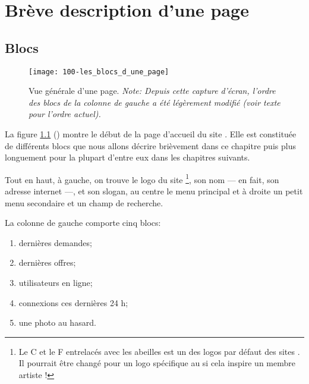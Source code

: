 \chapter{Brève description d'une page}

\section{Blocs}

\begin{figure}
    \texttt{[image: 100-les\_blocs\_d\_une\_page]}
    \caption[Vue générale d’une page]{Vue générale d’une page. \textsl{\small Note: Depuis cette capture d'écran, l'ordre des blocs de la colonne de gauche a été légèrement modifié (voir texte pour l'ordre actuel).}}
    \label{fig:vueGeneralePage}
\end{figure}

La figure \ref{fig:vueGeneralePage} () montre le début de la page d'accueil du site \CF. Elle est constituée de différents blocs que nous allons décrire brièvement dans ce chapitre puis plus longuement pour la plupart d’entre eux dans les chapitres suivants.


Tout en haut, à gauche, on trouve le logo du site%
\footnote{Le C et le F entrelacés avec les abeilles est un des logos par défaut des sites \CF. Il pourrait être changé pour un logo spécifique au \CdS{} si cela inspire un membre artiste !},
son nom --- en fait, son adresse internet ---, et son slogan, au centre le menu principal et à droite un petit menu secondaire et un champ de recherche.


La colonne de gauche comporte cinq blocs: 
\begin{enumerate}
    \item dernières demandes;
    \item dernières offres;
    \item utilisateurs en ligne;
    \item connexions ces dernières 24 h;
    \item une photo au hasard.
\end{enumerate}

